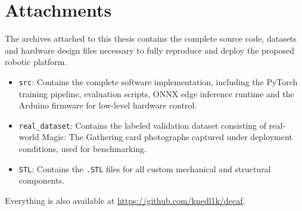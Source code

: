 
\chapter{Attachments}\label{app:A}

The archives attached to this thesis contains the complete source code, datasets and hardware design files necessary to fully reproduce and deploy the proposed robotic platform.
\begin{itemize}
    \item \texttt{src}: Contains the complete software implementation, including the PyTorch training pipeline, evaluation scripts, ONNX edge inference runtime and the Arduino firmware for low-level hardware control.
    \item \texttt{real\_dataset}: Contains the labeled validation dataset consisting of real-world Magic: The Gathering card photographs captured under deployment conditions, used for benchmarking.
    \item \texttt{STL}: Contains the \texttt{.STL} files for all custom mechanical and structural components.
\end{itemize}

Everything is also available at \url{https://github.com/knedl1k/decaf}.
